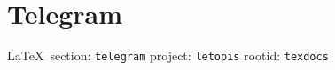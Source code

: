  
 
\chapter{Telegram}
\label{sec:telegram}

\vspace{0.5cm}
 {\ifDEBUG\small\LaTeX~section: \verb|telegram| project: \verb|letopis| rootid: \verb|texdocs|	\fi}
\vspace{0.5cm}


